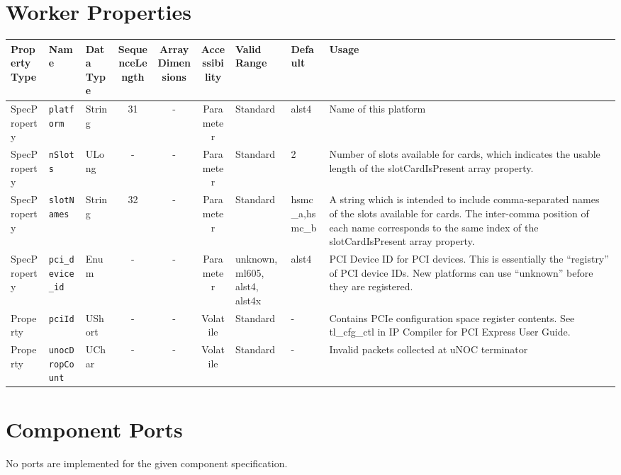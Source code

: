 \begin{landscape}
	\section*{Worker Properties}
	\begin{scriptsize}
		\begin{tabular}{|p{1.5cm}|p{2.5cm}|p{1.5cm}|c|c|c|p{2cm}|p{2cm}|p{3cm}|}
			\hline
			\rowcolor{blue}
			Property Type & Name                  & Data Type  & SequenceLength & ArrayDimensions & Accessibility       & Valid Range & Default & Usage                        \\
			\hline
			SpecProperty & \verb+platform+       & String & 31            & -               & Parameter & Standard & alst4 & Name of this platform               \\
			\hline
			SpecProperty & \verb+nSlots+         & ULong  & -             & -               & Parameter & Standard & 2 & Number of slots available for cards, which indicates the usable length of the slotCardIsPresent array property. \\
			\hline
			SpecProperty & \verb+slotNames+      & String & 32            & -               & Parameter & Standard & hsmc\_a,hsmc\_b   & A string which is intended to include comma-separated names of the slots available for cards. The inter-comma position of each name corresponds to the same index of the slotCardIsPresent array property. \\
			\hline
			SpecProperty & \verb+pci_device_id+ & Enum & -              & -               & Parameter & unknown, ml605, alst4, alst4x & alst4 & PCI Device ID for PCI devices. This is essentially the ``registry'' of PCI device IDs. New platforms can use ``unknown'' before they are registered. \\
			\hline
			Property & \verb+pciId+              & UShort & -             & -               & Volatile            & Standard    & -       & Contains PCIe configuration space register contents. See tl\_cfg\_ctl in IP Compiler for PCI Express User Guide. \\
			\hline
			Property & \verb+unocDropCount+      & UChar & -              & -               & Volatile            & Standard    & -       & Invalid packets collected at uNOC terminator \\
			\hline
		\end{tabular}
	\end{scriptsize}

	\section*{Component Ports}
	No ports are implemented for the given component specification.


\end{landscape}
